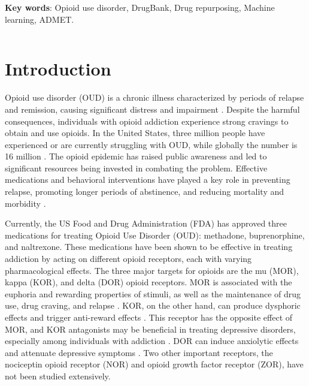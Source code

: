 \documentclass[10pt]{article}
\newcommand\multicollinenumbers{%
	\linenumbers
	\def\makeLineNumber{\docolaction{\makeLineNumberLeft}{}{\makeLineNumberRight}}}
\begin{document}
\textbf{Key words}: Opioid use disorder, DrugBank, Drug repurposing, Machine learning, ADMET.

\begin{verbatim}
\end{verbatim}


\newpage
\clearpage
\pagebreak
%
{\setcounter{tocdepth}{4} \tableofcontents}
\newpage

\setcounter{page}{1}
\renewcommand{\thepage}{{\arabic{page}}}

	
	
		\section{Introduction}
		
		
		
		Opioid use disorder (OUD) is a chronic illness characterized by periods of relapse and remission, causing significant distress and impairment \cite{mclellan2000drug}. Despite the harmful consequences, individuals with opioid addiction experience strong cravings to obtain and use opioids. In the United States, three million people have experienced or are currently struggling with OUD, while globally the number is 16 million \cite{dydyk2022opioid}. The opioid epidemic has raised public awareness and led to significant resources being invested in combating the problem. Effective medications and behavioral interventions have played a key role in preventing relapse, promoting longer periods of abstinence, and reducing mortality and morbidity \cite{douaihy2013medications}.
		
		
		
		Currently, the US Food and Drug Administration (FDA) has approved three medications for treating Opioid Use Disorder (OUD): methadone, buprenorphine, and naltrexone. These medications have been shown to be effective in treating addiction by acting on different opioid receptors, each with varying pharmacological effects. The three major targets for opioids are the mu (MOR), kappa (KOR), and delta (DOR) opioid receptors. MOR is associated with the euphoria and rewarding properties of stimuli, as well as the maintenance of drug use, drug craving, and relapse \cite{wang2019historical}. KOR, on the other hand, can produce dysphoric effects and trigger anti-reward effects \cite{wee2010role}. This receptor has the opposite effect of MOR, and KOR antagonists may be beneficial in treating depressive disorders, especially among individuals with addiction \cite{knoll2010dynorphin}. DOR can induce anxiolytic effects and attenuate depressive symptoms \cite{roberts2001increased}. Two other important receptors, the nociceptin opioid receptor (NOR) and opioid growth factor receptor (ZOR), have not been studied extensively.
		
\end{document}

